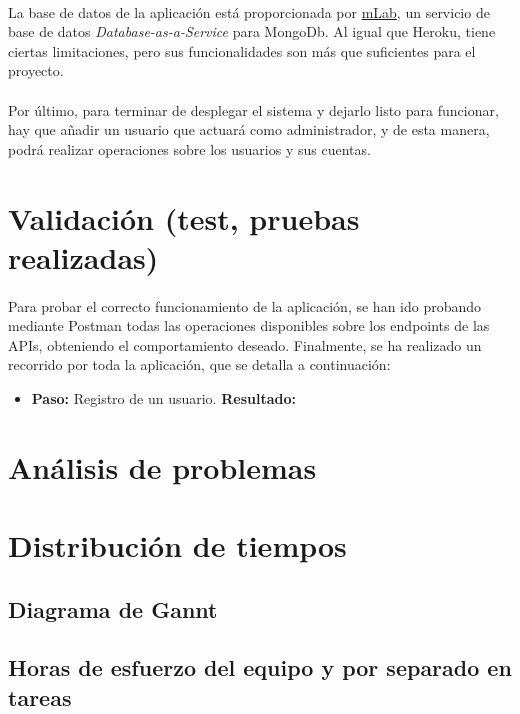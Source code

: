 \documentclass[a4paper]{article}
\begin{document}
\paragraph{}La base de datos de la aplicación está proporcionada por \href{https://mlab.com/}{mLab}, un servicio de base de datos \textit{Database-as-a-Service} para MongoDb. Al igual que Heroku, tiene ciertas limitaciones, pero sus funcionalidades son más que suficientes para el proyecto.

\paragraph{}Por último, para terminar de desplegar el sistema y dejarlo listo para funcionar, hay que añadir un usuario que actuará como administrador, y de esta manera, podrá realizar operaciones sobre los usuarios y sus cuentas.

\section{Validación (test, pruebas realizadas)}
\paragraph{}Para probar el correcto funcionamiento de la aplicación, se han ido probando mediante Postman todas las operaciones disponibles sobre los endpoints de las APIs, obteniendo el comportamiento deseado. Finalmente, se ha realizado un recorrido por toda la aplicación, que se detalla a continuación:
\begin{itemize}
	\item \textbf{Paso: }Registro de un usuario. \textbf{Resultado: }
\end{itemize}

\section{Análisis de problemas}

\section{Distribución de tiempos}
	\subsection{Diagrama de Gannt}
	\subsection{Horas de esfuerzo del equipo y por separado en tareas}
\end{document}
